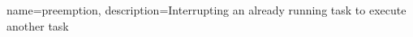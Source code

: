 {
    name=preemption,
    description={Interrupting an already running task to execute another task}
}


